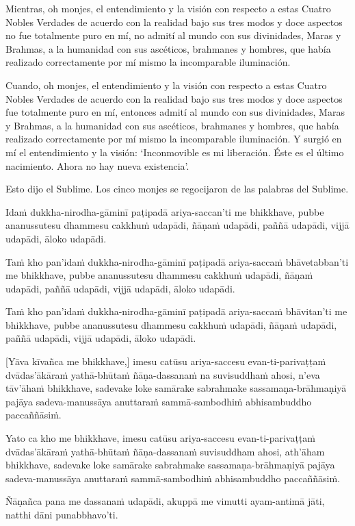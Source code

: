 Mientras, oh monjes, el entendimiento y la visión con respecto a estas Cuatro Nobles Verdades de acuerdo con la realidad bajo sus tres modos y doce aspectos no fue totalmente puro en mí, no admití al mundo con sus divinidades, Maras y Brahmas, a la humanidad con sus ascéticos, brahmanes y hombres, que había realizado correctamente por mí mismo la incomparable iluminación.

Cuando, oh monjes, el entendimiento y la visión con respecto a estas Cuatro Nobles Verdades de acuerdo con la realidad bajo sus tres modos y doce aspectos fue totalmente puro en mí, entonces admití al mundo con sus divinidades, Maras y Brahmas, a la humanidad con sus ascéticos, brahmanes y hombres, que había realizado correctamente por mí mismo la incomparable iluminación. Y surgió en mí el entendimiento y la visión: ‘Inconmovible es mi liberación. Éste es el último nacimiento. Ahora no hay nueva existencia’.

Esto dijo el Sublime. Los cinco monjes se regocijaron de las palabras del Sublime.


\clearpage

\paliText
\markboth{\paliTitle}{\rightmark}

Idaṁ dukkha-nirodha-gāminī paṭipadā ariya-saccan'ti me bhikkhave, pubbe
ananussutesu dhammesu cakkhuṁ udapādi, ñāṇaṁ udapādi, paññā udapādi,
vijjā udapādi, āloko udapādi.

Taṁ kho pan'idaṁ dukkha-nirodha-gāminī paṭipadā ariya-saccaṁ bhāvetabban'ti
me bhikkhave, pubbe ananussutesu dhammesu cakkhuṁ udapādi, ñāṇaṁ
udapādi, paññā udapādi, vijjā udapādi, āloko udapādi.

Taṁ kho pan'idaṁ dukkha-nirodha-gāminī paṭipadā ariya-saccaṁ bhāvitan'ti me
bhikkhave, pubbe ananussutesu dhammesu cakkhuṁ udapādi, ñāṇaṁ udapādi,
paññā udapādi, vijjā udapādi, āloko udapādi.

[Yāva kīvañca me bhikkhave,] imesu catūsu ariya-saccesu evan-ti-parivaṭṭaṁ
dvādas'ākāraṁ yathā-bhūtaṁ ñāṇa-dassanaṁ na suvisuddhaṁ ahosi, n'eva tāv'āhaṁ
bhikkhave, sadevake loke samārake sabrahmake sassamaṇa-brāhmaṇiyā pajāya
sadeva-manussāya anuttaraṁ sammā-sambodhiṁ abhisambuddho paccaññāsiṁ.

Yato ca kho me bhikkhave, imesu catūsu ariya-saccesu evan-ti-parivaṭṭaṁ
dvādas'ākāraṁ yathā-bhūtaṁ ñāṇa-dassanaṁ suvisuddham ahosi, ath'āham
bhikkhave, sadevake loke samārake sabrahmake sassamaṇa-brāhmaṇiyā pajāya
sadeva-manussāya anuttaraṁ sammā-sambodhiṁ abhisambuddho paccaññāsiṁ.

Ñāṇañca pana me dassanaṁ udapādi, akuppā me vimutti ayam-antimā jāti,
natthi dāni punabbhavo'ti.

